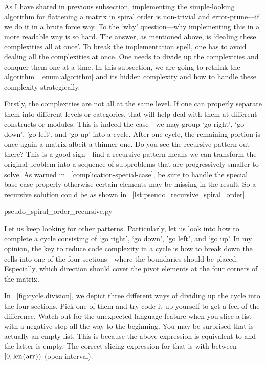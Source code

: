 As I have shared in previous subsection, implementing the simple-looking algorithm for flattening
a matrix in spiral order is non-trivial and error-prune---if we do it in a brute force way.
To the `why' question---why implementing this in a more readable way is so
hard.
The answer, as mentioned above, is `dealing these complexities all at once'.
To break the implementation spell, one has to avoid dealing all the complexities at once.
One needs to divide up the complexities and conquer them one at a time.
In this subsection, we are going to rethink the algorithm ~\autoref{enum:algorithm} and its
hidden complexity and how to handle these complexity strategically.

Firstly, the complexities are not all at the same level.
If one can properly separate them into different levels or categories, that will help deal with them
at different constructs or modules.
This is indeed the case---we may group `go right', `go down', 'go left', and `go up' into a cycle.
After one cycle, the remaining portion is once again a matrix albeit a thinner one.
Do you see the recursive pattern out there?
This is a good sign---find a recursive pattern means we can transform the original
problem into a sequence of subproblems that are progressively smaller to solve.
As warned in ~\autoref{complication-special-case}, be sure to handle the special base case properly
otherwise certain elements may be missing in the result.
So a recursive solution could be as shown in ~\autoref{lst:pseudo_recursive_spiral_order}.

\begin{clisting}
    
    {pseudo_spiral_order_recursive.py}
\end{clisting}
\newpage
Let us keep looking for other patterns.
Particularly, let us look into how to complete a cycle consisting of `go
right', `go down', 'go left', and `go up'.
In my opinion, the key to reduce code complexity in a cycle is how to break down the cells
into one of the four sections---where the boundaries should be placed.
Especially, which direction should cover the pivot elements at the four corners of the matrix.

In ~\autoref{fig:cycle.division}, we depict three different ways of dividing up the cycle into
the four sections.
Pick one of them and try code it up yourself to get a feel of the difference.
Watch out for the unexpected \python language feature when you slice a list
with a negative step all the way to the beginning.
You may be surprised that  is actually an empty list.
This is because the above expression is equivalent to 
and the latter is empty.
The correct slicing expression for that is  with  between $\left[0,
\mbox{\code{len(arr)}}\right)$ (open interval).

